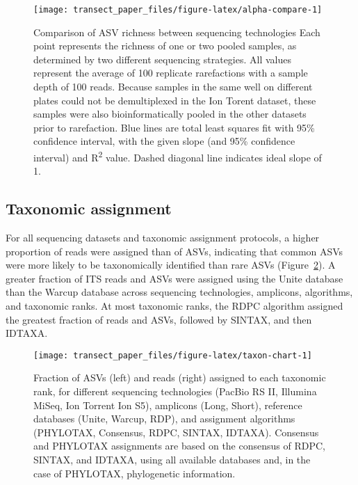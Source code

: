 \documentclass[
  12pt,
]{article}
\begin{document}
\begin{figure}

{\centering \texttt{[image: transect\_paper\_files/figure-latex/alpha-compare-1]} 

}

\caption[Comparison of ASV richness between sequencing technologies]{Comparison of ASV richness between sequencing technologies Each point represents the richness of one or two pooled samples, as determined by two different sequencing strategies. All values represent the average of 100 replicate rarefactions with a sample depth of 100 reads. Because samples in the same well on different plates could not be demultiplexed in the Ion Torent dataset, these samples were also bioinformatically pooled in the other datasets prior to rarefaction. Blue lines are total least squares fit with 95\% confidence interval, with the given slope (and 95\% confidence interval) and R\textsuperscript{2} value. Dashed diagonal line indicates ideal slope of 1.}\label{fig:alpha-compare}
\end{figure}

\hypertarget{taxonomic-assignment}{%
\subsection{Taxonomic assignment}\label{taxonomic-assignment}}

For all sequencing datasets and taxonomic assignment protocols, a higher proportion of reads were assigned than of ASVs, indicating that common ASVs were more likely to be taxonomically identified than rare ASVs (Figure~\ref{fig:taxon-chart}).
A greater fraction of ITS reads and ASVs were assigned using the Unite database than the Warcup database across sequencing technologies, amplicons, algorithms, and taxonomic ranks.
At most taxonomic ranks, the RDPC algorithm assigned the greatest fraction of reads and ASVs, followed by SINTAX, and then IDTAXA.






\begin{figure}

{\centering \texttt{[image: transect\_paper\_files/figure-latex/taxon-chart-1]} 

}

\caption[Summary of taxonomic assignments]{Fraction of ASVs (left) and reads (right) assigned to each taxonomic rank, for different sequencing technologies (PacBio RS II, Illumina MiSeq, Ion Torrent Ion S5), amplicons (Long, Short), reference databases (Unite, Warcup, RDP), and assignment algorithms (PHYLOTAX, Consensus, RDPC, SINTAX, IDTAXA).
Consensus and PHYLOTAX assignments are based on the consensus of RDPC, SINTAX, and IDTAXA, using all available databases and, in the case of PHYLOTAX, phylogenetic information.}\label{fig:taxon-chart}
\end{figure}
\end{document}
